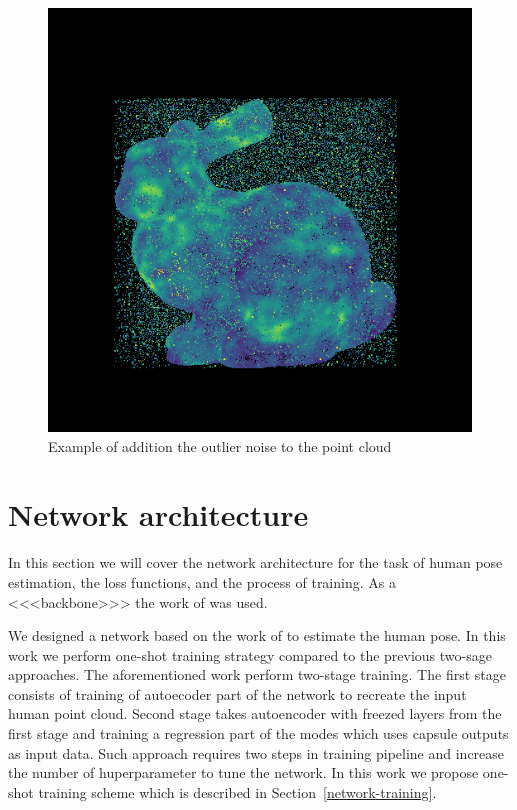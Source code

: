 \begin{figure}[htbp]
    \centerline{\includegraphics[scale=.6]{Figures/coords_outlier.png}}
    \caption{Example of addition the outlier noise to the point cloud \parencite{uchida_tom-uchidaadd_noise_to_point_cloud_2021}}
    \label{img:outlier-noise}
\end{figure}

\section{Network architecture}
\label{Network architecture}

In this section we will cover the network architecture for the task of human pose estimation, the loss functions, and the process of training.
As a <<<backbone>>> the work of \cite{wu_3d_2020} was used.


We designed a network based on the work of \cite{wu_3d_2020} to estimate the human pose. In this work we perform one-shot training strategy compared to the previous two-sage approaches. The aforementioned work perform two-stage training. The first stage consists of training of autoecoder part of the network to recreate the input human point cloud. Second stage takes autoencoder with freezed layers from the first stage and training a regression part of the modes which uses capsule outputs as input data. Such approach requires two steps in training pipeline and increase the number of huperparameter to tune the network. In this work we propose one-shot training scheme which is described in Section~\ref{network-training}.


